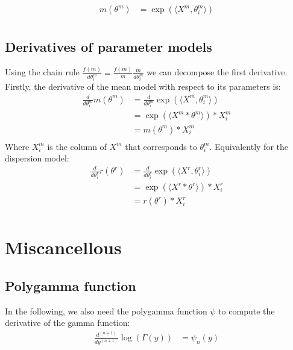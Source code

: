 \documentclass[bibliography=totoc,10pt]{scrartcl}
\begin{document}
\begin{equation}
\begin{split}
m(\theta^m) &= \exp(\langle X^m, \theta^m_i \rangle) \\
\end{split}
\end{equation}

\subsection{Derivatives of parameter models}
Using the chain rule $\frac{f(m)}{d \theta^m_i}=\frac{f(m)}{m}\frac{m}{d \theta^m_i}$ we can decompose the first derivative. Firstly, the derivative of the mean model with respect to its parameters is:
\begin{equation}
\begin{split}
\frac{d}{d \theta^m_i} m(\theta^m) &= \frac{d}{d \theta^m_i} \exp(\langle X^m, \theta^m_i \rangle) \\
&= \exp(\langle X^m * \theta^m \rangle) * X^m_{i}  \\
&= m(\theta^m) * X^m_{i}  \\
\end{split}
\end{equation}
Where $X^m_{i}$ is the column of $X^m$ that corresponds to $\theta^m_i$. Equivalently for the dispersion model: 
\begin{equation}
\begin{split}
\frac{d}{d \theta^r_i} r( \theta^r) &= \frac{d}{d \theta^r_i} \exp(\langle X^r, \theta^r_i \rangle) \\
&= \exp(\langle X^r * \theta^r \rangle) * X^r_{i}  \\
&= r(\theta^r) * X^r_{i}  \\
\end{split}
\end{equation}

\section{Miscancellous}
\subsection{Polygamma function}
In the following, we also need the polygamma function $\psi$ to compute the derivative of the gamma function:
\begin{equation}
\begin{split}
\frac{d^{(n+1)}}{d y^{(n+1)}} \log(\Gamma(y)) &= \psi_n(y) \\
\end{split}
\end{equation}
\end{document}
